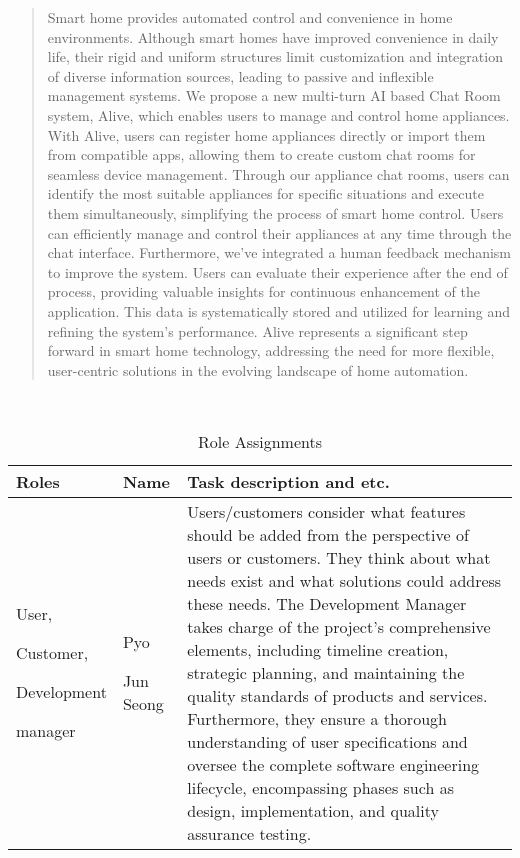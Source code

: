\documentclass[conference]{IEEEtran}
\begin{document}
\begin{abstract}
Smart home provides automated control and convenience in home environments. Although smart homes have improved convenience in daily life, their rigid and uniform structures limit customization and integration of diverse information sources, leading to passive and inflexible management systems. We propose a new multi-turn AI based Chat Room system, Alive, which enables users to manage and control home appliances. With Alive, users can register home appliances directly or import them from compatible apps, allowing them to create custom chat rooms for seamless device management. Through our appliance chat rooms, users can identify the most suitable appliances for specific situations and execute them simultaneously, simplifying the process of smart home control. Users can efficiently manage and control their appliances at any time through the chat interface. Furthermore, we've integrated a human feedback mechanism to improve the system. Users can evaluate their experience after the end of process, providing valuable insights for continuous enhancement of the application. This data is systematically stored and utilized for learning and refining the system's performance. Alive represents a significant step forward in smart home technology, addressing the need for more flexible, user-centric solutions in the evolving landscape of home automation.
\end{abstract}

\begin{table}[h] \\
\caption{Role Assignments}
\def\arraystretch{1.24} \small

\begin{tabular}{|p{1.5cm}|p{1.2cm}|p{4.9cm}|}
    \hline
    Roles & Name & Task description and etc. \\ 
    \hline
    User, \par Customer,\par Development \par manager & Pyo \par Jun Seong & Users/customers consider what features should be added from the perspective of users or customers. They think about what needs exist and what solutions could address these needs.
    The Development Manager takes charge of the project's comprehensive elements, including timeline creation, strategic planning, and maintaining the quality standards of products and services. Furthermore, they ensure a thorough understanding of user specifications and oversee the complete software engineering lifecycle, encompassing phases such as design, implementation, and quality assurance testing.\\
    \hline
\end{tabular}
\end{table}
\end{document}
